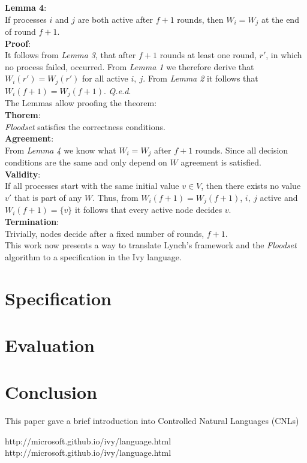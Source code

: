 \documentclass[fleqn]{article}
\begin{document}
\noindent \textbf{Lemma 4}:\\
If processes $i$ and $j$ are both active after $f+1$ rounds, then $W_i = W_j$ at the end of round $f + 1$.\\
\textbf{Proof}:\\
It follows from \textit{Lemma 3}, that after $f+1$ rounds at least one round, $r'$, in which no process failed, occurred. From \textit{Lemma 1} we therefore derive that $W_i(r') = W_j(r')$ for all active $i,\ j$.
From \textit{Lemma 2} it follows that $W_i(f+1) = W_j(f+1)$. \textit{Q.e.d}.\\

\noindent The Lemmas allow proofing the theorem:\\
\noindent \textbf{Thorem}:\\
\textit{Floodset} satisfies the correctness conditions.\\
\textbf{Agreement}:\\
From \textit{Lemma 4} we know what $W_i = W_j$ after $f+1$ rounds. Since all decision conditions are the same and only depend on $W$ agreement is satisfied.\\
\textbf{Validity}:\\
If all processes start with the same initial value $v ∈ V$, then there exists no value $v'$ that is part of any $W$. Thus, from $W_i(f+1) = W_j(f+1)$, $i,\ j$ active and $W_i(f+1) = \{v\}$ it follows
that every active node decides $v$.\\
\textbf{Termination}:\\
Trivially, nodes decide after a fixed number of rounds, $f+1$.\\

This work now presents a way to translate Lynch's framework and the \textit{Floodset} algorithm to a specification in the Ivy language.

\section{Specification}


\section{Evaluation}


\section{Conclusion}
This paper gave a brief introduction into Controlled Natural Languages (CNLs)

\begin{thebibliography}{99}

     http://microsoft.github.io/ivy/language.html
     http://microsoft.github.io/ivy/language.html
\end{thebibliography}

\end{document}

